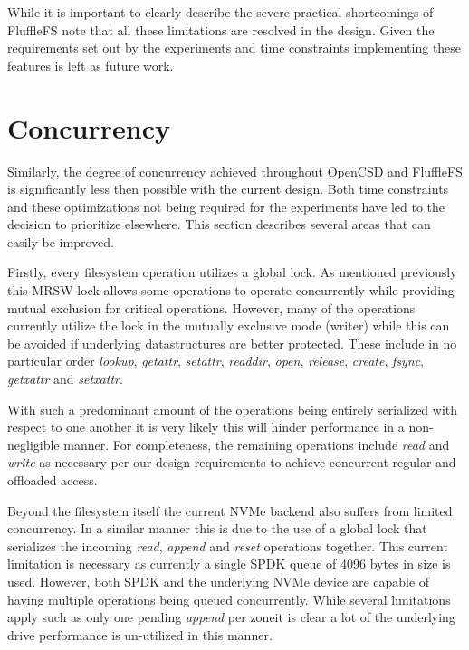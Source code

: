 While it is important to clearly describe the severe practical shortcomings of
FluffleFS note that all these limitations are resolved in the design. Given the
requirements set out by the experiments and time constraints implementing these
features is left as future work.

\section{Concurrency}

Similarly, the degree of concurrency achieved throughout OpenCSD and FluffleFS
is significantly less then possible with the current design. Both time
constraints and these optimizations not being required for the experiments have
led to the decision to prioritize elsewhere. This section describes several
areas that can easily be improved.

Firstly, every filesystem operation utilizes a global lock. As mentioned
previously this MRSW lock allows some operations to operate concurrently while
providing mutual exclusion for critical operations. However, many of the
operations currently utilize the lock in the mutually exclusive mode (writer)
while this can be avoided if underlying datastructures are better protected.
These include in no particular order \textit{lookup}, \textit{getattr},
\textit{setattr}, \textit{readdir}, \textit{open}, \textit{release},
\textit{create}, \textit{fsync}, \textit{getxattr} and \textit{setxattr}.

With such a predominant amount of the operations being entirely serialized with
respect to one another it is very likely this will hinder performance in a
non-negligible manner. For completeness, the remaining operations include
\textit{read} and \textit{write} as necessary per our design requirements to
achieve concurrent regular and offloaded access.

Beyond the filesystem itself the current NVMe backend also suffers from limited
concurrency. In a similar manner this is due to the use of a global lock that
serializes the incoming \textit{read}, \textit{append} and \textit{reset}
operations together. This current limitation is necessary as currently a single
SPDK queue of 4096 bytes in size is used. However, both SPDK and the underlying
NVMe device are capable of having multiple operations being queued concurrently.
While several limitations apply such as only one pending \textit{append} per
zone\footnotemark[16] it is clear a lot of the underlying drive performance is
un-utilized in this manner.

